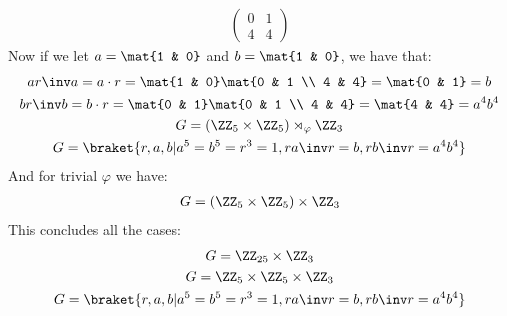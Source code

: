 \begin{enumerate}[label=]
        \begin{gather*}
            \begin{pmatrix}
                0 & 1 \\
                4 & 4
            \end{pmatrix}
        \end{gather*}
        Now if we let $a = \mat{1 & 0}$ and $b = \mat{1 & 0}$, we have that:
        \begin{gather*}
            ar \inv a = a \cdot r = \mat{1 & 0} \mat{0 & 1 \\ 4 & 4} = \mat{0 & 1} = b\\
            br \inv b = b \cdot r = \mat{0 & 1} \mat{0 & 1 \\ 4 & 4} = \mat{4 & 4} = a^4 b^4\\
            G = (\ZZ_5 \times \ZZ_5) \rtimes_\varphi \ZZ_3 \\
            G = \braket{r, a, b| a^5 = b^5 = r^3 = 1, r a \inv r = b, r b \inv r = a^4 b^4}
        \end{gather*}
        And for trivial $\varphi$ we have:
        \begin{gather*}
            G = (\ZZ_5 \times \ZZ_5) \times \ZZ_3
        \end{gather*}
        This concludes all the cases:
        \begin{gather*}
            G = \ZZ_{25} \times \ZZ_3 \\
            G = \ZZ_5 \times \ZZ_5 \times \ZZ_3 \\
            G = \braket{r, a, b| a^5 = b^5 = r^3 = 1, r a \inv r = b, r b \inv r = a^4 b^4}
        \end{gather*}
\end{enumerate}